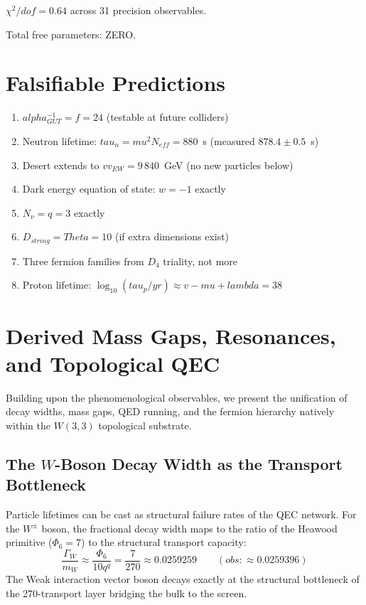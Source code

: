 \documentclass[12pt,a4paper]{article}
\def\mathrm#1{#1}%
\def\textbf#1{#1}%
\def\text#1{#1}%
\def\alpha{alpha}%
\def\lambda{lambda}%
\def\mu{mu}%
\def\Phi#1{Phi#1}%
\def\tau{tau}%
\def\Theta{Theta}%
\def\cdot{ }%
\theoremstyle{definition}
\newcommand{\Phisix}{\Phi_6}
\newcommand{\Neff}{N_{\mathrm{eff}}}
\newcommand{\vEW}{v_{\mathrm{EW}}}
\begin{document}
\vspace{0.3cm}
$\chi^2/\text{dof} = 0.64$ across 31 precision observables.

\noindent\textbf{Total free parameters: ZERO.}


\section{Falsifiable Predictions}
\label{sec:predictions}

\begin{enumerate}[label=\textbf{P\arabic*.}]
\item $\alpha_{\text{GUT}}^{-1} = f = 24$ (testable at future colliders)
\item Neutron lifetime: $\tau_n = \mu^2\Neff = 880$~s
  (measured $878.4\pm 0.5$~s)
\item Desert extends to $v\cdot\vEW = 9\,840$~GeV (no new particles below)
\item Dark energy equation of state: $w=-1$ exactly
\item $N_\nu = q = 3$ exactly
\item $D_{\text{string}} = \Theta = 10$ (if extra dimensions exist)
\item Three fermion families from $D_4$ triality, not more
\item Proton lifetime:
  $\log_{10}(\tau_p/\text{yr})\approx v-\mu+\lambda = 38$
\end{enumerate}


\section{Derived Mass Gaps, Resonances, and Topological QEC}
\label{sec:mass-gaps}

Building upon the phenomenological observables, we present the unification of decay widths, mass gaps, QED running, and the fermion hierarchy natively within the $W(3,3)$ topological substrate.

\subsection{\texorpdfstring{The $W$-Boson Decay Width as the Transport Bottleneck}{The W-Boson Decay Width as the Transport Bottleneck}}
Particle lifetimes can be cast as structural failure rates of the QEC network. For the $W^\pm$ boson, the fractional decay width maps to the ratio of the Heawood primitive ($\Phisix = 7$) to the structural transport capacity:
\begin{equation}
\frac{\Gamma_W}{m_W} \approx \frac{\Phisix}{10\cdot q^q} = \frac{7}{270} \approx 0.0259259 \qquad (\text{obs: } \approx 0.0259396)
\end{equation}
The Weak interaction vector boson decays exactly at the structural bottleneck of the 270-transport layer bridging the bulk to the screen.
\end{document}
